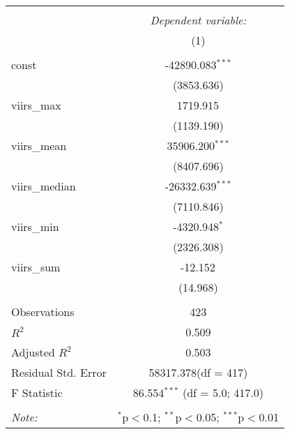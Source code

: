 \begin{table}[!htbp] \centering
\begin{tabular}{@{\extracolsep{5pt}}lc}
\\[-1.8ex]\hline
\hline \\[-1.8ex]
& \multicolumn{1}{c}{\textit{Dependent variable:}} \
\cr \cline{1-2}
\\[-1.8ex] & (1) \\
\hline \\[-1.8ex]
 const & -42890.083$^{***}$ \\
  & (3853.636) \\
 viirs_max & 1719.915$^{}$ \\
  & (1139.190) \\
 viirs_mean & 35906.200$^{***}$ \\
  & (8407.696) \\
 viirs_median & -26332.639$^{***}$ \\
  & (7110.846) \\
 viirs_min & -4320.948$^{*}$ \\
  & (2326.308) \\
 viirs_sum & -12.152$^{}$ \\
  & (14.968) \\
\hline \\[-1.8ex]
 Observations & 423 \\
 $R^2$ & 0.509 \\
 Adjusted $R^2$ & 0.503 \\
 Residual Std. Error & 58317.378(df = 417)  \\
 F Statistic & 86.554$^{***}$ (df = 5.0; 417.0) \\
\hline
\hline \\[-1.8ex]
\textit{Note:} & \multicolumn{1}{r}{$^{*}$p$<$0.1; $^{**}$p$<$0.05; $^{***}$p$<$0.01} \\
\end{tabular}
\end{table}